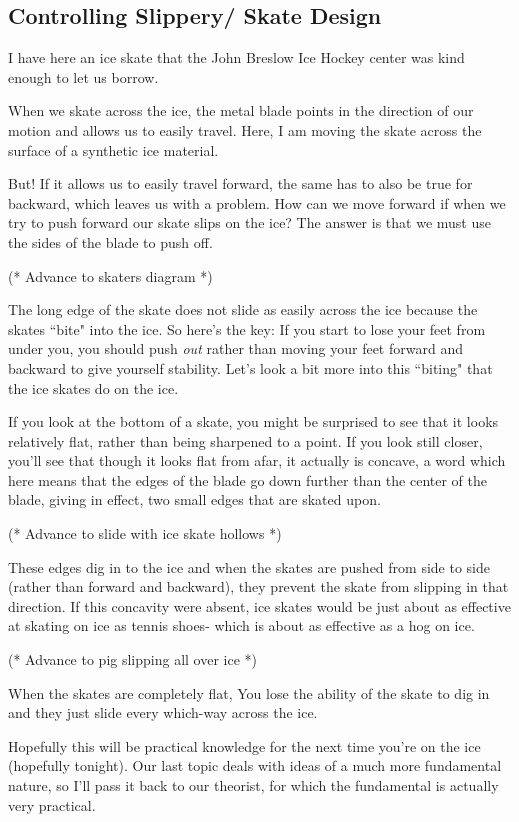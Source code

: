 \documentclass[12pt]{article}
\begin{document}
\subsection{Controlling Slippery/ Skate Design}

I have here an ice skate that the John Breslow Ice Hockey 
center was kind enough to let us borrow.

When we skate across the ice, the metal blade
points in the direction of our motion and allows us to easily travel. 
Here, I am moving the skate across the surface of a synthetic ice 
material. 

But! If it allows us to easily travel forward, the same has to also be true 
for backward, which leaves us with a problem. 
How can we move forward if when we try to push forward our skate slips 
on the ice? The answer
is that we must use the sides of the blade to push off. 

(* Advance to skaters diagram *)

The long
edge of the skate does not slide as easily across the ice because the
skates ``bite" into the ice. So here's the key:
If you start to lose your feet from under you,
you should push \emph{out} rather than moving your feet forward and 
backward to 
give yourself stability. Let's look a bit more into this ``biting" that
the ice skates do on the ice. 

If you look at the bottom of a skate, you might be surprised to see that it looks relatively
flat, rather than being sharpened to a point. If you look still closer, you'll see that 
though it looks flat from afar, it actually is concave, a word which here means that the
edges of the blade go down further than the center of the blade, giving in effect, two small 
edges that are skated upon.

(* Advance to slide with ice skate hollows *)

These edges dig in to the ice and when the skates are pushed from side
to side (rather than forward and backward), they prevent the skate from slipping in that direction. 
If this concavity were absent, ice skates would be just about as
effective at skating on ice as tennis shoes- which is about as effective as a hog on ice.

(* Advance to pig slipping all over ice *)

When the skates are completely flat, 
You lose the ability of the skate to dig in
and they just slide every which-way across the ice. 

Hopefully this will be practical knowledge for the next time you're on 
the ice (hopefully tonight). Our last topic deals with ideas 
of a much more fundamental nature, so I'll pass it back to our 
theorist, for which the fundamental is actually very practical.
\end{document}
